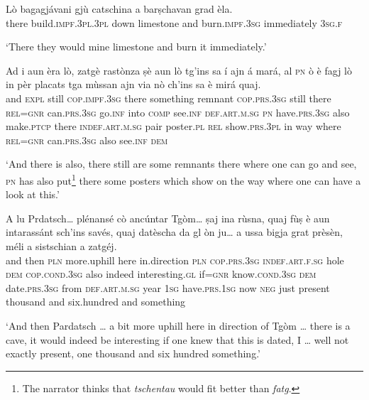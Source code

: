 \begin{linenumbers}
\gll Lò bagagjávani gjù catschina a barṣchavan grad èla.   \\
there build.\textsc{impf.3pl.3pl} down limestone and  burn.\textsc{impf.3sg} immediately  \textsc{3sg.f}   \\
\end{linenumbers}
\medskip
\glt `There they would mine limestone and burn it immediately.'
\medskip

\begin{linenumbers}
\gll Ad i aun èra lò, zatgè rastònza ṣè aun lò tg’ins sa í ajn á mará, al \textsc{pn} ò è fagj lò in pèr placats tga mùssan ajn via nò ch’ins sa è mirá quaj.\\
and \textsc{expl} still \textsc{cop.impf.3sg} there something remnant \textsc{cop.prs.3sg} still there \textsc{rel=gnr} can.\textsc{prs.3sg} go.\textsc{inf} into \textsc{comp} see.\textsc{inf} \textsc{def.art.m.sg} \textsc{pn} have.\textsc{prs.3sg} also make.\textsc{ptcp} there \textsc{indef.art.m.sg} pair poster.\textsc{pl} \textsc{rel} show.\textsc{prs.3pl} in way where \textsc{rel=gnr} can.\textsc{prs.3sg} also see.\textsc{inf} \textsc{dem} \\
\end{linenumbers}
\medskip
\glt `And there is also, there still are some remnants there where one can go and see, \textsc{pn} has also put\footnote{The narrator thinks that \textit{tschentau} would fit better than \textit{fatg}.} there some posters which show on the way where one can have a look at this.'
\medskip

\begin{linenumbers}
\gll A lu Prdatsch… plénansé cò ancúntar Tgòm… ṣaj ina rùsna, quaj fùṣ è aun intarassánt sch’ins savés, quaj datèscha da gl òn ju… a ussa bigja grat prèsèn, méli a sistschian a zatgéj.   \\
and then \textsc{pln} more.uphill here in.direction \textsc{pln} \textsc{cop.prs.3sg} \textsc{indef.art.f.sg} hole \textsc{dem} \textsc{cop.cond.3sg} also indeed interesting.\textsc{gl} if\textsc{=gnr} know.\textsc{cond.3sg} \textsc{dem} date.\textsc{prs.3sg} from \textsc{def.art.m.sg} year \textsc{1sg} have.\textsc{prs.1sg} now \textsc{neg} just present thousand and six.hundred and something   \\
\end{linenumbers}
\medskip
\glt `And then Pardatsch … a bit more uphill here in direction of Tgòm … there is a cave, it would indeed be interesting if one knew that this is dated, I … well not exactly present, one thousand and six hundred something.'
\medskip

